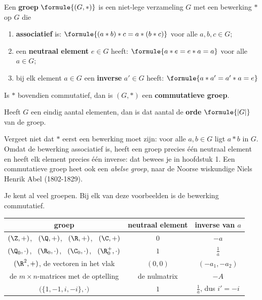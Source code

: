 \begin{theorie}
Een \textbf{\textcolor{accent}{groep}} $\formule{(G, \ast)}$ is een niet-lege verzameling $G$ met een bewerking $\ast$ op $G$ die

\vspace{1mm}
\begin{enumerate}[leftmargin=8mm,itemsep=1mm]
\item \textbf{\textcolor{accent}{associatief}} is: \quad $\formule{(a \ast b) \ast c = a \ast (b \ast c)}$ \quad voor alle $a, b, c \in G$;
\item een \textbf{\textcolor{accent}{neutraal element}} $e \in G$ heeft: \quad $\formule{a \ast e = e \ast a = a}$ \quad voor alle $a \in G$;
\item bij elk element $a \in G$ een \textbf{\textcolor{accent}{inverse}} $a' \in G$ heeft: \quad $\formule{a \ast a' = a' \ast a = e}$
\end{enumerate}

\vspace{1mm}
Is $\ast$ bovendien commutatief, dan is $(G, \ast)$ een \textbf{\textcolor{accent}{commutatieve groep}}.

\vspace{1mm}
Heeft $G$ een eindig aantal elementen, dan is dat aantal de \textbf{\textcolor{accent}{orde}} $\formule{|G|}$ van de groep.
\end{theorie}

Vergeet niet dat $\ast$ eerst een bewerking moet zijn: voor alle $a, b \in G$ ligt $a \ast b$ in $G$. Omdat de bewerking associatief is, heeft een groep precies één neutraal element en heeft elk element precies één inverse: dat bewees je in hoofdstuk 1. Een commutatieve groep heet ook een \textit{abelse groep}, naar de Noorse wiskundige Niels Henrik Abel (1802-1829).

Je kent al veel groepen. Bij elk van deze voorbeelden is de bewerking commutatief.

\begin{center}
\renewcommand{\arraystretch}{1.3}
\begin{tabular}{|c|c|c|}
\hline
\rowcolor{accent!14} groep & neutraal element & inverse van $a$ \\ \hline
$(\Z, +)$, \ $(\Q, +)$, \ $(\R, +)$, \ $(\C, +)$ & $0$ & $-a$ \\ \hline
$(\Q_0, \cdot)$, \ $(\R_0, \cdot)$, \ $(\C_0, \cdot)$, \ $(\R^+_0, \cdot)$ & $1$ & $\tfrac1a$ \\ \hline
$(\R^2, +)$, de vectoren in het vlak & $(0, 0)$ & $(-a_1, -a_2)$ \\ \hline
de $m \times n$-matrices met de optelling & de nulmatrix & $-A$ \\ \hline
$\bigl(\{1, -1, i, -i\}, \cdot\bigr)$ & $1$ & $\tfrac1a$, dus $i' = -i$ \\ \hline
\end{tabular}
\end{center}

